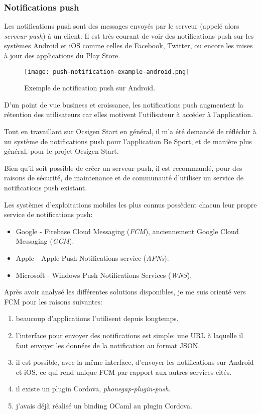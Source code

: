 \subsubsection*{Notifications push}

Les notifications push sont des messages envoyés par le serveur (appelé alors
\emph{serveur push}) à un client.
Il est très courant de voir des notifications push sur les systèmes Android
et iOS comme celles de Facebook, Twitter, ou encore les mises à jour des
applications du Play Store.

\begin{figure}
  \centering
  \texttt{[image: push-notification-example-android.png]}
  \caption{Exemple de notification push sur Android.}
\end{figure}

D'un point de vue business et croissance, les notifications push
augmentent la rétention des utilisateurs car elles motivent l'utilisateur à
accéder à l'application.

Tout en travaillant sur Ocsigen Start en général, il m'a été demandé de
réfléchir à un système de notifications push pour l'application Be Sport, et de
manière plus général, pour le projet Ocsigen Start.

Bien qu'il soit possible de créer un serveur push,
il est recommandé, pour des raisons de sécurité, de maintenance et de communauté
d'utiliser un service de notifications push existant.

Les systèmes d'exploitations mobiles les plus connus possèdent chacun leur propre
service de notifications push:
\begin{itemize}
  \item Google - Firebase Cloud Messaging (\emph{FCM}), anciennement Google Cloud
  Messaging (\emph{GCM}).
  \item Apple - Apple Push Notifications service (\emph{APNs}).
  \item Microsoft - Windows Push Notifications Services (\emph{WNS}).
\end{itemize}

Après avoir analysé les différentes solutions disponibles, je me suis orienté
vers FCM pour les raisons suivantes:

\begin{enumerate}
  \item beaucoup d'applications l'utilisent depuis longtemps.
  \item l'interface pour envoyer des notifications est simple: une URL à
    laquelle il faut envoyer les données de la notification au format JSON.
  \item il est possible, avec la même interface, d'envoyer les notifications sur
    Android et iOS, ce qui rend unique FCM par rapport aux autres services cités.
  \item il existe un plugin Cordova, \emph{phonegap-plugin-push}.
  \item j'avais déjà réalisé un binding OCaml au plugin Cordova\cite{ocaml-cordova-plugin-push-notifications}.
\end{enumerate}

